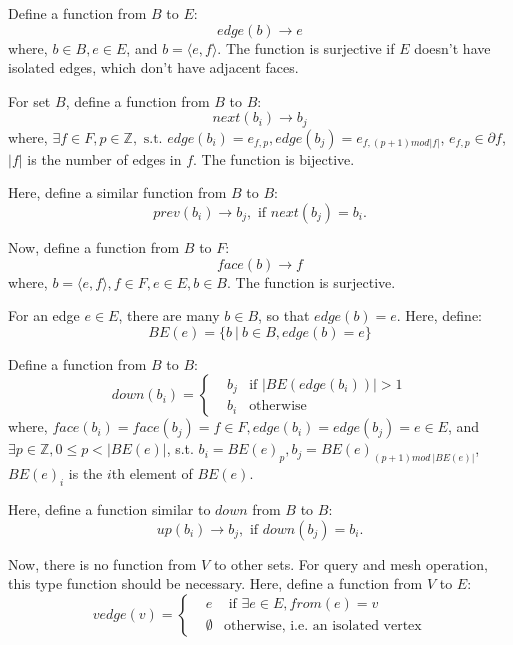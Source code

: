 \documentclass[9pt,twocolumn]{extarticle}
\begin{document}
Define a function from $B$ to $E$:
\begin{equation}
edge(b) \rightarrow e
\end{equation}
where, $b\in B, e\in E$, and $b=\langle e,f \rangle$. 
The function is surjective if $E$ doesn't have isolated edges,
which don't have adjacent faces.

For set $B$, define a function from $B$ to $B$:
\begin{equation}
next(b_i) \rightarrow b_j
\end{equation}
where, $\exists f\in F, p\in \mathbb{Z}, 
\mbox{ s.t. } edge(b_i)=e_{f,p},edge(b_j)=e_{f,(p+1)mod|f|}$, $e_{f,p}\in \partial f$, 
$|f|$ is the number of edges in $f$. The function is bijective.

Here, define a similar function from $B$ to $B$:
\begin{equation}
prev(b_i) \rightarrow b_j, \mbox{ if }next(b_j)=b_i.
\end{equation}

Now, define a function from $B$ to $F$:
\begin{equation}
face(b) \rightarrow f
\end{equation}
where, $b=\langle e,f \rangle, f\in F, e\in E, b\in B$. The function 
is surjective.

For an edge $e\in E$, there are many $b\in B$, so that $edge(b)=e$. Here, define:
\begin{equation}
BE(e)=\{b\ |\ b\in B, edge(b)=e \}
\end{equation}

Define a function from $B$ to $B$:
\begin{equation}
down(b_i)=
\left\{
\begin{aligned}
&b_j & \mbox{if }|BE(edge(b_i))|>1\\
&b_i & \mbox{otherwise}
\end{aligned}
\right.
\end{equation}
where, $face(b_i)=face(b_j)=f\in F, edge(b_i)=edge(b_j)=e\in E$, 
and $\exists p\in \mathbb{Z}, 0\leq p<|BE(e)|$,
s.t. $b_i=BE(e)_p,b_j=BE(e)_{(p+1)mod\ |BE(e)|}$, $BE(e)_i$ is the $i$th element of $BE(e)$.

Here, define a function similar to $down$ from $B$ to $B$:
\begin{equation}
up(b_i) \rightarrow b_j, \mbox{ if }down(b_j)=b_i.
\end{equation}

Now, there is no function from $V$ to other sets. For query and mesh operation,
this type function should be necessary. Here, define a function from $V$ to $E$:
\begin{equation}
vedge(v)=
\left\{
\begin{aligned}
&e& \mbox{ if }\exists e\in E, from(e)=v\\
&\emptyset & \mbox{otherwise, i.e. an isolated vertex}
\end{aligned}\right.
\end{equation}
\end{document}
